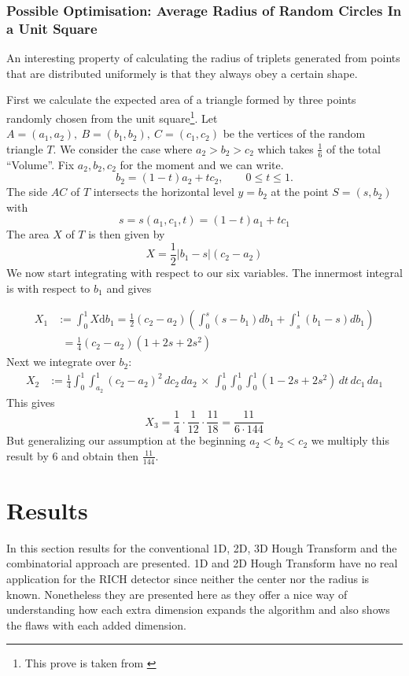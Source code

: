 \documentclass[11pt,twoside]{scrreprt}
\begin{document}

\subsection{Possible Optimisation: Average Radius of Random Circles In a Unit Square} %
\label{ssub:average_radius_of_random_circles_in_a_unit_square}
An interesting property of calculating the radius of triplets generated from points that are distributed uniformely is that they always obey a certain shape.

First we calculate the expected area of a triangle formed by three points randomly chosen from the unit square\footnote{This prove is taken from \cite{Blatter:2015}}. Let \( A = (a_1, a_2),\ B = (b_1, b_2),\ C = (c_1, c_2)\) be the vertices of the random triangle \( T \). We consider the case where \( a_2
> b_2 > c_2 \) which takes $\frac{1}{6}$ of the total ``Volume''. Fix \( a_2, b_2, c_2 \) for the moment and we can write.
\[
  b_2 = (1-t)a_2 + tc_2, \qquad 0 \leq t \leq 1.
\]
The side $AC$ of $T$ intersects the horizontal level $y=b_2$ at the point $S=(s,b_2)$ with
\begin{equation}
  s = s(a_1,c_1,t) = (1-t)a_1 + tc_1
\end{equation}
The area $X$ of $T$ is then given by
\[
  X = \frac{1}{2}\lvert b_1 - s\rvert(c_2 - a_2)
\]
We now start integrating with respect to our six variables. The innermost integral is with respect to $b_1$ and gives

\begin{align}
  X_1 &:= \int_0^1X\text{d}b_1=\frac{1}{2}(c_2-a_2)\left( \int_0^s(s-b_1)db_1 + \int_s^1(b_1-s)db_1\right)\nonumber\\
      &\phantom{:}= \frac{1}{4}(c_2-a_2)(1+2s+2s^2)\nonumber
\end{align}
Next we integrate over $b_2$:
\begin{align}
  X_2 &:= \frac{1}{4}\int_0^1\int_{a_2}^1(c_2-a_2)^2\,dc_2\,da_2\,\times\,\int_0^1\int_0^1\int_0^1(1-2s+2s^2)\,dt\,dc_1\,da_1  \nonumber
\end{align}
This gives
\[
  X_3 = \frac{1}{4}\cdot \frac{1}{12} \cdot \frac{11}{18} = \frac{11}{6\cdot144}
\]
But generalizing our assumption at the beginning $a_2 < b_2 < c_2$ we multiply this result by $6$ and obtain then $\frac{11}{144}$.

\chapter{Results}
\label{cha:results}
In this section results for the conventional 1D, 2D, 3D Hough Transform and the combinatorial approach are presented. 1D and 2D Hough Transform
have no real application for the RICH detector since neither the center nor the radius is known. Nonetheless they are presented here as they offer a nice
way of understanding how each extra dimension expands the algorithm and also
shows the flaws with each added dimension.
\end{document}
